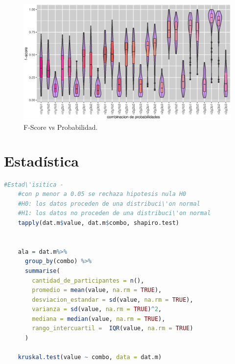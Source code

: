 \documentclass{article}
\begin{document}
\begin{figure}[htb!] %
    \centering
    \includegraphics[width=150mm]{DLD.eps} %
    \caption{F-Score vs Probabilidad.}
    \label{Figura 1}
\end{figure}


\section{Estad\'istica}

\begin{lstlisting}[language=R, caption= Segmento de c\'odigo Pruebas Estad\'isticas .]
    #Estad\'isitica - 
    #con p menor a 0.05 se rechaza hipotesis nula H0
    #H0: los datos proceden de una distribuci\'on normal
    #H1: los datos no proceden de una distribuci\'on normal
    tapply(dat.m$value, dat.m$combo, shapiro.test)
    
      
    ala = dat.m%>%
      group_by(combo) %>%
      summarise(
        cantidad_de_participantes = n(),
        promedio = mean(value, na.rm = TRUE),
        desviacion_estandar = sd(value, na.rm = TRUE),
        varianza = sd(value, na.rm = TRUE)^2,
        mediana = median(value, na.rm = TRUE),
        rango_intercuartil =  IQR(value, na.rm = TRUE)
      )
    
    kruskal.test(value ~ combo, data = dat.m)
\end{lstlisting}
\end{document}
